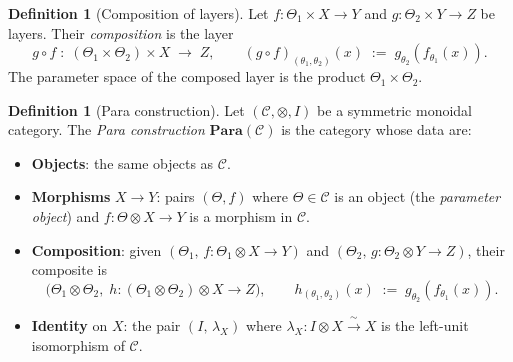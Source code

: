 \documentclass[11pt]{amsart}
\theoremstyle{plain}
\theoremstyle{definition}
\newtheorem{definition}[theorem]{Definition}
\begin{document}
\begin{definition}[Composition of layers]
\label{def:layer-composition}
Let $f : \Theta_1 \times X \to Y$ and $g : \Theta_2 \times Y \to Z$ be layers.
Their \emph{composition} is the layer
\[
    g \circ f \;:\; (\Theta_1 \times \Theta_2) \times X \;\longrightarrow\; Z,
    \qquad (g \circ f)_{(\theta_1,\theta_2)}(x) \;:=\; g_{\theta_2}(f_{\theta_1}(x)).
\]
The parameter space of the composed layer is the product $\Theta_1 \times
\Theta_2$.
\end{definition}

\begin{definition}[Para construction]
\label{def:para}
Let $(\mathcal{C}, \otimes, I)$ be a symmetric monoidal category.
The \emph{Para construction} $\mathbf{Para}(\mathcal{C})$ is the category whose
data are:
\begin{itemize}
    \item \textbf{Objects}: the same objects as $\mathcal{C}$.
    \item \textbf{Morphisms} $X \to Y$: pairs $(\Theta, f)$ where
    $\Theta \in \mathcal{C}$ is an object (the \emph{parameter object}) and
    $f : \Theta \otimes X \to Y$ is a morphism in $\mathcal{C}$.
    \item \textbf{Composition}: given
    $(\Theta_1,\, f : \Theta_1 \otimes X \to Y)$ and
    $(\Theta_2,\, g : \Theta_2 \otimes Y \to Z)$, their composite is
    \[
        \bigl(\Theta_1 \otimes \Theta_2,\;
        h : (\Theta_1 \otimes \Theta_2) \otimes X \to Z\bigr),
        \qquad h_{(\theta_1,\theta_2)}(x) \;:=\; g_{\theta_2}(f_{\theta_1}(x)).
    \]
    \item \textbf{Identity} on $X$: the pair $(I,\, \lambda_X)$ where
    $\lambda_X : I \otimes X \xrightarrow{\;\sim\;} X$ is the left-unit
    isomorphism of $\mathcal{C}$.
\end{itemize}
\end{definition}
\end{document}
